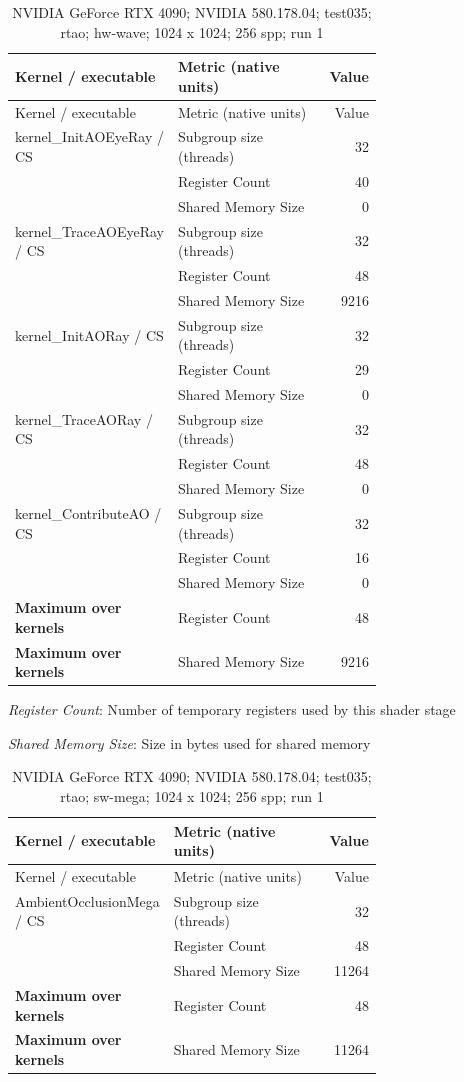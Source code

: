 \begin{longtable}{p{0.30\linewidth}p{0.43\linewidth}r}
\caption{NVIDIA GeForce RTX 4090; NVIDIA 580.178.04; test035; rtao; hw-wave; 1024 x 1024; 256 spp; run 1}\label{tab:hydra-profile-17}\\
\hline Kernel / executable & Metric (native units) & Value \\\hline
\endfirsthead
\hline Kernel / executable & Metric (native units) & Value \\\hline
\endhead
kernel\_InitAOEyeRay / CS & Subgroup size (threads) & 32 \\
 & Register Count & 40 \\
 & Shared Memory Size & 0 \\
\hline
kernel\_TraceAOEyeRay / CS & Subgroup size (threads) & 32 \\
 & Register Count & 48 \\
 & Shared Memory Size & 9216 \\
\hline
kernel\_InitAORay / CS & Subgroup size (threads) & 32 \\
 & Register Count & 29 \\
 & Shared Memory Size & 0 \\
\hline
kernel\_TraceAORay / CS & Subgroup size (threads) & 32 \\
 & Register Count & 48 \\
 & Shared Memory Size & 0 \\
\hline
kernel\_ContributeAO / CS & Subgroup size (threads) & 32 \\
 & Register Count & 16 \\
 & Shared Memory Size & 0 \\
\hline
\textbf{Maximum over kernels} & Register Count & 48 \\
\textbf{Maximum over kernels} & Shared Memory Size & 9216 \\
\hline
\end{longtable}
\noindent\textit{Register Count}: Number of temporary registers used by this shader stage\par
\noindent\textit{Shared Memory Size}: Size in bytes used for shared memory\par
\begin{longtable}{p{0.30\linewidth}p{0.43\linewidth}r}
\caption{NVIDIA GeForce RTX 4090; NVIDIA 580.178.04; test035; rtao; sw-mega; 1024 x 1024; 256 spp; run 1}\label{tab:hydra-profile-18}\\
\hline Kernel / executable & Metric (native units) & Value \\\hline
\endfirsthead
\hline Kernel / executable & Metric (native units) & Value \\\hline
\endhead
AmbientOcclusionMega / CS & Subgroup size (threads) & 32 \\
 & Register Count & 48 \\
 & Shared Memory Size & 11264 \\
\hline
\textbf{Maximum over kernels} & Register Count & 48 \\
\textbf{Maximum over kernels} & Shared Memory Size & 11264 \\
\hline
\end{longtable}
